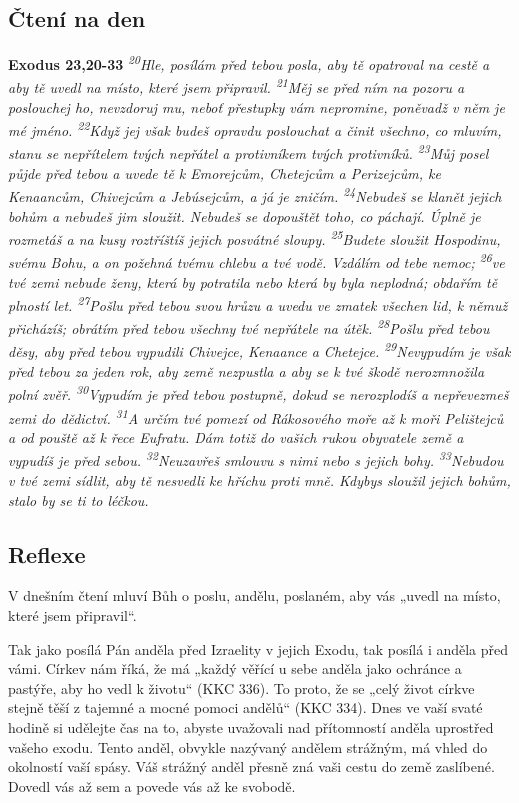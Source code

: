 \documentclass[11pt]{article}
\begin{document}
\subsection*{Čtení na den}
\textbf{Exodus 23,20-33}
\newline
\textit{
\textsuperscript{20}Hle, posílám před tebou posla, aby tě opatroval na cestě a aby tě uvedl na místo, které jsem připravil.
\textsuperscript{21}Měj se před ním na pozoru a poslouchej ho, nevzdoruj mu, neboť přestupky vám nepromine, poněvadž v něm je mé jméno.
\textsuperscript{22}Když jej však budeš opravdu poslouchat a činit všechno, co mluvím, stanu se nepřítelem tvých nepřátel a protivníkem tvých protivníků.
\textsuperscript{23}Můj posel půjde před tebou a uvede tě k Emorejcům, Chetejcům a Perizejcům, ke Kenaancům, Chivejcům a Jebúsejcům, a já je zničím.
\textsuperscript{24}Nebudeš se klanět jejich bohům a nebudeš jim sloužit. Nebudeš se dopouštět toho, co páchají. Úplně je rozmetáš a na kusy roztříštíš jejich posvátné sloupy.
\textsuperscript{25}Budete sloužit Hospodinu, svému Bohu, a on požehná tvému chlebu a tvé vodě. Vzdálím od tebe nemoc;
\textsuperscript{26}ve tvé zemi nebude ženy, která by potratila nebo která by byla neplodná; obdařím tě plností let.
\textsuperscript{27}Pošlu před tebou svou hrůzu a uvedu ve zmatek všechen lid, k němuž přicházíš; obrátím před tebou všechny tvé nepřátele na útěk.
\textsuperscript{28}Pošlu před tebou děsy, aby před tebou vypudili Chivejce, Kenaance a Chetejce.
\textsuperscript{29}Nevypudím je však před tebou za jeden rok, aby země nezpustla a aby se k tvé škodě nerozmnožila polní zvěř.
\textsuperscript{30}Vypudím je před tebou postupně, dokud se nerozplodíš a nepřevezmeš zemi do dědictví.
\textsuperscript{31}A určím tvé pomezí od Rákosového moře až k moři Pelištejců a od pouště až k řece Eufratu. Dám totiž do vašich rukou obyvatele země a vypudíš je před sebou.
\textsuperscript{32}Neuzavřeš smlouvu s nimi nebo s jejich bohy.
\textsuperscript{33}Nebudou v tvé zemi sídlit, aby tě nesvedli ke hříchu proti mně. Kdybys sloužil jejich bohům, stalo by se ti to léčkou.
}

\subsection*{Reflexe}
V dnešním čtení mluví Bůh o poslu, andělu, poslaném, aby vás „uvedl na místo, které jsem připravil“.

Tak jako posílá Pán anděla před Izraelity v jejich Exodu, tak posílá i anděla před vámi. Církev nám říká, že má „každý
věřící u sebe anděla jako ochránce a pastýře, aby ho vedl k životu“ (KKC 336). To proto, že se „celý život církve stejně
těší z tajemné a mocné pomoci andělů“ (KKC 334). Dnes ve vaší svaté hodině si udělejte čas na to, abyste uvažovali
nad přítomností anděla uprostřed vašeho exodu. Tento anděl, obvykle nazývaný andělem strážným, má vhled do
okolností vaší spásy. Váš strážný anděl přesně zná vaši cestu do země zaslíbené. Dovedl vás až sem a povede vás až ke
svobodě.
\end{document}

